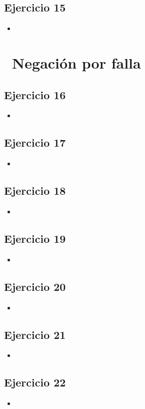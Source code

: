 \documentclass[10pt,a4paper]{article}
\begin{document}
\subsection{Ejercicio 15}
\begin{itemize}
\item
\end{itemize}
\section*{\ Negación por falla}

\subsection{Ejercicio 16}
\begin{itemize}
\item
\end{itemize}

\subsection{Ejercicio 17}
\begin{itemize}
\item
\end{itemize}

\subsection{Ejercicio 18}
\begin{itemize}
\item
\end{itemize}

\subsection{Ejercicio 19}
\begin{itemize}
\item
\end{itemize}


\subsection{Ejercicio 20}
\begin{itemize}
\item
\end{itemize}

\subsection{Ejercicio 21}
\begin{itemize}
\item
\end{itemize}

\subsection{Ejercicio 22}
\begin{itemize}
\item
\end{itemize}
\end{document}
